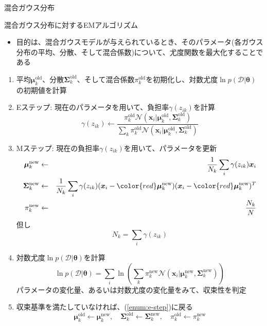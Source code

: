 \documentclass[dvipdfmx,notheorems,t]{beamer}
\begin{document}
\begin{frame}{混合ガウス分布}

\begin{block}{混合ガウス分布に対するEMアルゴリズム}
	\begin{itemize}
		\item 目的は、混合ガウスモデルが与えられているとき、そのパラメータ(各ガウス分布の平均、分散、そして混合係数)について、尤度関数を最大化することである
	\end{itemize}
\end{block}

\begin{enumerate}
	\item 平均$\bm{\mu}_k^\mathrm{old}$、分散$\bm{\Sigma}_k^\mathrm{old}$、そして混合係数$\pi_k^\mathrm{old}$を初期化し、対数尤度$\ln p(\mathcal{D} | \bm{\theta})$の初期値を計算
	
	\item \alert{Eステップ}: 現在のパラメータを用いて、負担率$\gamma(z_{ik})$を計算 \label{enum:e-step}
	\begin{equation}
		\gamma(z_{ik}) \leftarrow \frac{\pi_k^\mathrm{old} \mathcal{N}(\bm{x}_i | \bm{\mu}_k^\mathrm{old}, \bm{\Sigma}_k^\mathrm{old})}{\sum_k \pi_k^\mathrm{old} \mathcal{N}(\bm{x}_i | \bm{\mu}_k^\mathrm{old}, \bm{\Sigma}_k^\mathrm{old})}
	\end{equation}
		
	\item \alert{Mステップ}: 現在の負担率$\gamma(z_{ik})$を用いて、パラメータを更新 \label{enum:m-step}
	\begin{eqnarray}
		\bm{\mu}_k^\mathrm{new} &\leftarrow& \frac{1}{N_k} \sum_i \gamma(z_{ik}) \bm{x}_i \\
		\bm{\Sigma}_k^\mathrm{new} &\leftarrow& \frac{1}{N_k} \sum_i \gamma(z_{ik}) (\bm{x}_i - \color{red}\bm{\mu}_k^\mathrm{new}\normalcolor ) (\bm{x}_i - \color{red}\bm{\mu}_k^\mathrm{new}\normalcolor )^T \\
		\pi_k^\mathrm{new} &\leftarrow& \frac{N_k}{N}
	\end{eqnarray}
	但し
	\begin{equation}
		N_k = \sum_i \gamma(z_{ik})
	\end{equation}
	
	\item 対数尤度$\ln p(\mathcal{D} | \bm{\theta})$を計算
	\begin{equation}
		\ln p(\mathcal{D} | \bm{\theta}) = \sum_i \ln \left( \sum_k \pi_k^\mathrm{new} \mathcal{N}(\bm{x}_i | \bm{\mu}_k^\mathrm{new}, \bm{\Sigma}_k^\mathrm{new}) \right)
	\end{equation}
	パラメータの変化量、あるいは対数尤度の変化量をみて、収束性を判定
	
	\item 収束基準を満たしていなければ、(\ref{enum:e-step})に戻る
	\begin{equation}
		\bm{\mu}_k^\mathrm{old} \leftarrow \bm{\mu}_k^\mathrm{new}, \quad \bm{\Sigma}_k^\mathrm{old} \leftarrow \bm{\Sigma}_k^\mathrm{new}, \quad \pi_k^\mathrm{old} \leftarrow \pi_k^\mathrm{new}
	\end{equation}
\end{enumerate}

\end{frame}
\end{document}
